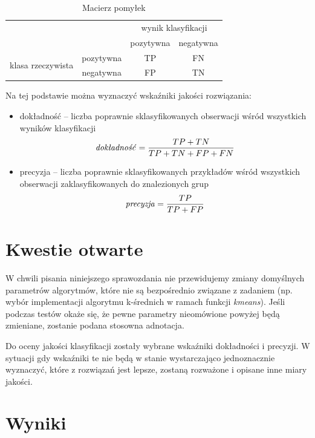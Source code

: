 \documentclass[11pt,a4paper,twoside]{article}
\begin{document}
\begin{table}[ht]
\centering
\caption{Macierz pomyłek}
\label{confusionMatrix}
\begin{tabular}{|*{4}{c|}}
\cline{3-4}
  \multicolumn{2}{c}{} & \multicolumn{2}{|c|}{wynik klasyfikacji}\\\cline{3-4}
  \multicolumn{2}{c|}{} & pozytywna & negatywna\\\hline
  \multirow{2}{*}{klasa rzeczywista}& pozytywna & TP & FN\\\cline{2-4}
  & negatywna & FP & TN\\\hline
\end{tabular}
\end{table}

Na tej podstawie można wyznaczyć wskaźniki jakości rozwiązania:
\begin{itemize}[label={--}]
\item dokładność -- liczba poprawnie sklasyfikowanych obserwacji wśród wszystkich wyników klasyfikacji $$\text{\emph{dokładność}} = \frac{TP+TN}{TP+TN+FP+FN}$$
\item precyzja -- liczba poprawnie sklasyfikowanych przykładów wśród wszystkich obserwacji zaklasyfikowanych do znalezionych grup $$\text{\emph{precyzja}} = \frac{TP}{TP+FP}$$
\end{itemize}


\section{Kwestie otwarte}
W chwili pisania niniejszego sprawozdania nie przewidujemy zmiany domyślnych parametrów algorytmów, które nie są bezpośrednio związane z zadaniem (np. wybór implementacji algorytmu k-średnich w ramach funkcji \textit{kmeans}). Jeśli podczas testów okaże się, że pewne parametry nieomówione powyżej będą zmieniane, zostanie podana stosowna adnotacja.

Do oceny jakości klasyfikacji zostały wybrane wskaźniki dokładności i precyzji. W sytuacji gdy wskaźniki te nie będą w stanie wystarczająco jednoznacznie wyznaczyć, które z rozwiązań jest lepsze, zostaną rozważone i opisane inne miary jakości.

\section{Wyniki}
\end{document}
